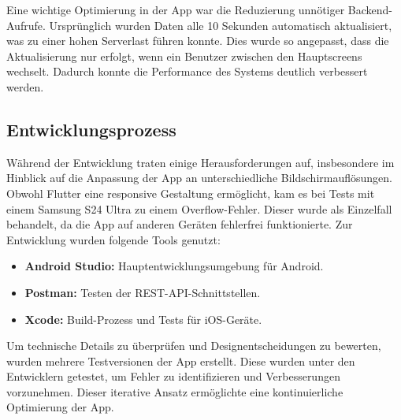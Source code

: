 Eine wichtige Optimierung in der App war die Reduzierung unnötiger Backend-Aufrufe. Ursprünglich wurden Daten alle 10 Sekunden automatisch aktualisiert, was zu einer hohen Serverlast führen konnte. Dies wurde so angepasst, dass die Aktualisierung nur erfolgt, wenn ein Benutzer zwischen den Hauptscreens wechselt. Dadurch konnte die Performance des Systems deutlich verbessert werden.

\subsection{Entwicklungsprozess}
Während der Entwicklung traten einige Herausforderungen auf, insbesondere im Hinblick auf die Anpassung der App an unterschiedliche Bildschirmauflösungen. Obwohl Flutter eine responsive Gestaltung ermöglicht, kam es bei Tests mit einem Samsung S24 Ultra zu einem Overflow-Fehler. Dieser wurde als Einzelfall behandelt, da die App auf anderen Geräten fehlerfrei funktionierte. Zur Entwicklung wurden folgende Tools genutzt:

\begin{itemize}
    \item \textbf{Android Studio:} Hauptentwicklungsumgebung für Android.
    \item \textbf{Postman:} Testen der REST-API-Schnittstellen.
    \item \textbf{Xcode:} Build-Prozess und Tests für iOS-Geräte.
\end{itemize}

Um technische Details zu überprüfen und Designentscheidungen zu bewerten, wurden mehrere Testversionen der App erstellt. Diese wurden unter den Entwicklern getestet, um Fehler zu identifizieren und Verbesserungen vorzunehmen. Dieser iterative Ansatz ermöglichte eine kontinuierliche Optimierung der App.

